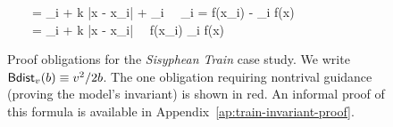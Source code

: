 \begin{figure}[p]
\begin{center}
\begin{sllisting}
  \hspace{0.5em}\text{--}\hspace{0.4em}\Init \, \land \, \Inv \, \land \, \TrainFxMax = \omega_i + k |x - x_i| + \eta_i \, \land \, \omega_i = f(x_i) - \eta_i \limply f(x) \le \TrainFxMax\\
  \hspace{0.5em}\text{--}\hspace{0.4em}\Init \, \land \, \Inv \, \land \, \TrainFxMax = \TrainFxMax_i + k |x - x_i| \, \land \, f(x_i) \le \TrainFxMax_i \limply f(x) \le \TrainFxMax\\
\end{sllisting}
\end{center}
\caption{Proof obligations for the \emph{Sisyphean Train} case study. We write $\textsf{Bdist}_{v}(b) \equiv v^2/2b$. The one obligation requiring nontrival guidance (proving the model's invariant) is shown in red. An informal proof of this formula is available in Appendix~\ref{ap:train-invariant-proof}.}
\label{fig:targets-sisyphean-train}
\Description[]{}
\end{figure}

